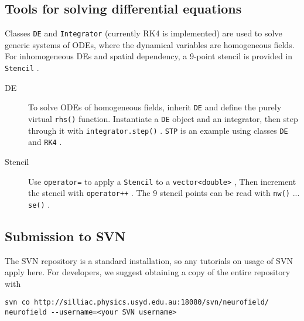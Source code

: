 \documentclass[12pt,a4paper]{article}
\newcommand{\type}[1]{ {\small\small\tt #1} }
\begin{document}
\subsection{Tools for solving differential equations}

Classes \type{DE} and \type{Integrator} (currently RK4 is implemented) are used to solve generic systems of ODEs, where the dynamical variables are homogeneous fields. For inhomogeneous DEs and spatial dependency, a 9-point stencil is provided in \type{Stencil}.

\begin{description}
	\item[DE] To solve ODEs of homogeneous fields, inherit \type{DE} and define the purely virtual \type{rhs()} function. Instantiate a \type{DE} object and an integrator, then step through it with \type{integrator.step()}. \type{STP} is an example using classes \type{DE} and \type{RK4}.
	\item[Stencil] Use \type{operator=} to apply a \type{Stencil} to a \type{vector<double>}, Then increment the stencil with \type{operator++}. The 9 stencil points can be read with \type{nw()} ... \type{se()}.
\end{description}



\subsection{Submission to SVN}
The SVN repository is a standard installation, so any tutorials on usage of SVN apply here. For developers, we suggest obtaining a copy of the entire repository with

\begin{lstlisting}
svn co http://silliac.physics.usyd.edu.au:18080/svn/neurofield/ neurofield --username=<your SVN username>
\end{lstlisting}
	
\end{document}
